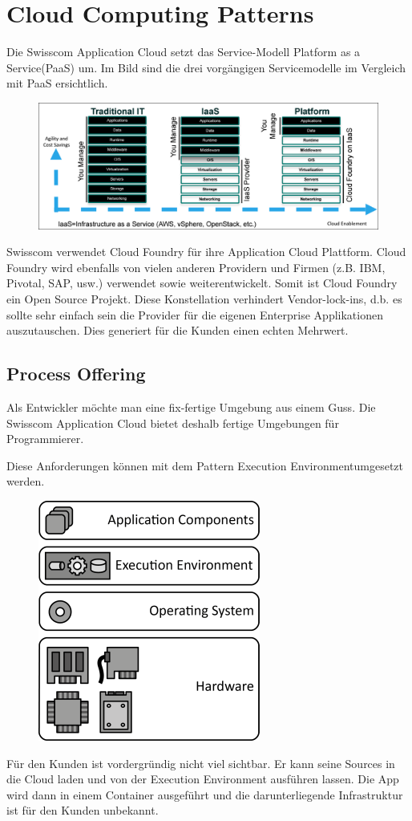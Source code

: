\chapter{Cloud Computing Patterns}
Die Swisscom Application Cloud setzt das Service-Modell \glqq Platform as a Service\grqq (PaaS) um. Im Bild sind die drei vorgängigen Servicemodelle im Vergleich mit PaaS ersichtlich.
\begin{figure}[H]
\centering
\includegraphics[scale=0.25]{images/power-of-platform.png}
\end{figure}
Swisscom verwendet Cloud Foundry für ihre Application Cloud Plattform. Cloud Foundry wird ebenfalls von vielen anderen Providern und Firmen (z.B. IBM, Pivotal, SAP, usw.) verwendet sowie weiterentwickelt. Somit ist Cloud Foundry ein Open Source Projekt. Diese Konstellation verhindert Vendor-lock-ins, d.b. es sollte sehr einfach sein die Provider für die eigenen Enterprise Applikationen auszutauschen. Dies generiert für die Kunden einen echten Mehrwert.
 
\section{Process Offering}
Als Entwickler möchte man eine fix-fertige Umgebung aus einem Guss. Die Swisscom Application Cloud bietet deshalb fertige Umgebungen für Programmierer. 

Diese Anforderungen können mit dem Pattern \glqq Execution Environment\grqq umgesetzt werden.
\begin{figure}[H]
\centering
\includegraphics[scale=3]{images/execution-environment.png}
\end{figure}
Für den Kunden ist vordergründig nicht viel sichtbar. Er kann seine Sources in die Cloud laden und von der Execution Environment ausführen lassen. Die App wird dann in einem Container ausgeführt und die darunterliegende Infrastruktur ist für den Kunden unbekannt. 

